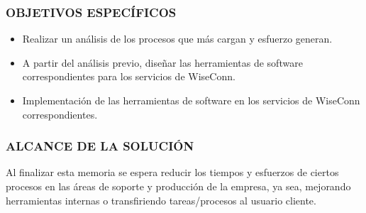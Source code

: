 \subsubsection{OBJETIVOS ESPECÍFICOS}
\begin{itemize}
    \item Realizar un análisis de los procesos que más cargan y esfuerzo generan.\iffalse, como también de funcionalidades/herramientas necesarias para el plan gratuito.\fi
    \item A partir del análisis previo, diseñar las herramientas de software correspondientes para los servicios de WiseConn.
    \item Implementación de las herramientas de software en los servicios de WiseConn correspondientes.
\end{itemize}

\subsubsection{ALCANCE DE LA SOLUCIÓN}
Al finalizar esta memoria se espera reducir los tiempos y esfuerzos de ciertos procesos en las áreas de soporte y producción de la empresa, ya sea, mejorando herramientas internas o transfiriendo tareas/procesos al usuario cliente. \iffalse También, ayudar a reducir la brecha de cobros en servicios SaaS con alternativas gratuitas de ciertas funcionalidades, lo que permitiría que el plan gratuito de Wiseconn cumpla con las especificaciones comerciales.\fi
